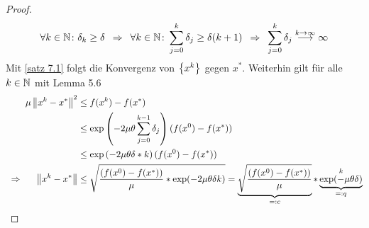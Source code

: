 \begin{proof}
	\begin{equation*}
		\forall k \in \mathbb{N} \colon \delta_k \ge \delta \enskip \Rightarrow \enskip \forall k \in \mathbb{N} \colon \sum_{j=0}^k \delta_j \ge \delta (k+1) \enskip \Rightarrow \enskip \sum_{j=0}^k \delta_j \overset{k \to \infty}{\longrightarrow} \infty
	\end{equation*}
	Mit \cref{satz 7.1} folgt die Konvergenz von $\left\{ x^k \right\}_{}$ gegen $x^\ast$. Weiterhin gilt für alle $k \in \mathbb{N}$ mit Lemma 5.6
	\begin{align*}
		\mu \left\lVert x^k - x^\ast \right\rVert^2 &\le f(x^k) - f(x^\ast) \\
		&\le \exp \left( - 2 \mu \theta \sum_{j=0}^{k-1} \delta_j \right) (f(x^0) - f(x^\ast)) \\
		&\le \exp \left( -2 \mu \theta \delta * k \right) (f(x^0) - f(x^\ast)) \\ \enskip \Rightarrow \enskip \quad \left\lVert x^k - x^\ast \right\rVert &\le \sqrt{\frac{(f(x^0) - f(x^\ast))}{\mu} * \exp(-2\mu \theta \delta k)} = \underbrace{\sqrt{\frac{(f(x^0) - f(x^\ast))}{\mu}}}_{\mathrel{=:} c} * \underbrace{\exp(-\mu \theta \delta)}_{\mathrel{=:} q}^k
	\end{align*}
\end{proof}